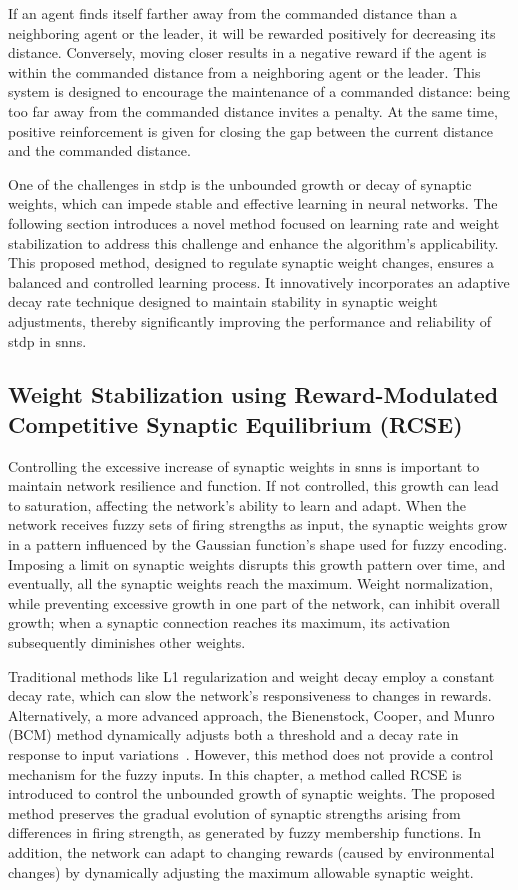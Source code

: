 If an agent finds itself farther away from the commanded distance than a neighboring agent or the leader, it will be rewarded positively for decreasing its distance. Conversely, moving closer results in a negative reward if the agent is within the commanded distance from a neighboring agent or the leader. This system is designed to encourage the maintenance of a commanded distance: being too far away from the commanded distance invites a penalty. At the same time, positive reinforcement is given for closing the gap between the current distance and the commanded distance.

One of the challenges in \ac{stdp} is the unbounded growth or decay of synaptic weights, which can impede stable and effective learning in neural networks. The following section introduces a novel method focused on learning rate and weight stabilization to address this challenge and enhance the algorithm's applicability. This proposed method, designed to regulate synaptic weight changes, ensures a balanced and controlled learning process. It innovatively incorporates an adaptive decay rate technique designed to maintain stability in synaptic weight adjustments, thereby significantly improving the performance and reliability of \ac{stdp} in \ac{snn}s.

\subsection{Weight Stabilization using Reward-Modulated Competitive Synaptic Equilibrium (RCSE)}

Controlling the excessive increase of synaptic weights in \ac{snn}s is important to maintain network resilience and function. If not controlled, this growth can lead to saturation, affecting the network's ability to learn and adapt. When the network receives fuzzy sets of firing strengths as input, the synaptic weights grow in a pattern influenced by the Gaussian function's shape used for fuzzy encoding. Imposing a limit on synaptic weights disrupts this growth pattern over time, and eventually, all the synaptic weights reach the maximum. Weight normalization, while preventing excessive growth in one part of the network, can inhibit overall growth; when a synaptic connection reaches its maximum, its activation subsequently diminishes other weights. 

Traditional methods like L1 regularization and weight decay employ a constant decay rate, which can slow the network's responsiveness to changes in rewards. Alternatively, a more advanced approach, the Bienenstock, Cooper, and Munro (BCM) method dynamically adjusts both a threshold and a decay rate in response to input variations~\cite{udeigwe2017emergent}. However, this method does not provide a control mechanism for the fuzzy inputs. In this chapter, a method called \ac{RCSE} is introduced to control the unbounded growth of synaptic weights. The proposed method preserves the gradual evolution of synaptic strengths arising from differences in firing strength, as generated by fuzzy membership functions. In addition, the network can adapt to changing rewards (caused by environmental changes) by dynamically adjusting the maximum allowable synaptic weight.

